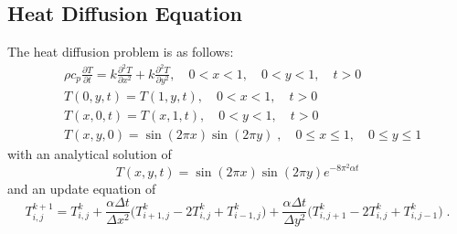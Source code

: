 \documentclass[mca,article,submit,moreauthors,pdftex]{Definitions/mdpi}
\begin{document}
\begin{paracol}{2}
\linenumbers
\switchcolumn

\appendix
\section{Heat Diffusion Equation}
\label{Heat-Diffusion}
The heat diffusion problem is as follows:
\begin{align*}
    &\rho c_p \frac{\partial T}{\partial t} = k\frac{\partial^2 T}{\partial x^2}+k\frac{\partial^2 T}{\partial y^2},\quad 0<x<1,\quad 0<y<1,\quad t>0\\
    &T(0,y,t) = T(1,y,t),\quad 0<x<1,\quad t>0\\
    &T(x,0,t) = T(x,1,t),\quad 0<y<1,\quad t>0\\
    &T(x,y,0) = \sin(2\pi x) \sin(2\pi y) \;, \quad 0\leq x\leq 1,\quad 0 \leq y \leq 1
\end{align*}
with an analytical solution of
\begin{equation*}
\label{heat-analyt}
    T(x,y,t) = \sin(2\pi x) \sin(2\pi y) e^{-8\pi^2\alpha t}
\end{equation*}
and an update equation of 
\begin{equation*}
    \label{heat-update}
    T_{i,j}^{k+1} = T_{i,j}^{k}+\frac{\alpha \Delta t}{\Delta x^2}\big(T_{i+1,j}^{k}-2T_{i,j}^{k}+T_{i-1,j}^{k}\big)+\frac{\alpha \Delta t}{\Delta y^2}\big(T_{i,j+1}^{k}-2T_{i,j}^{k}+T_{i,j-1}^{k}\big) \;.
\end{equation*}

\appendix

\end{paracol}
\end{document}
